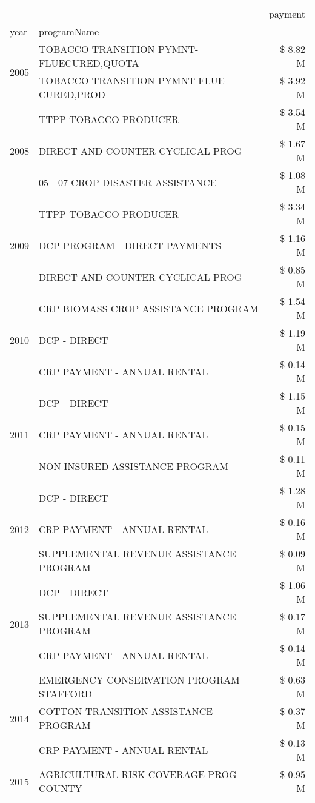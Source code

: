 \begin{tabular}{llr}
\toprule
 &  & payment \\
year & programName &  \\
\midrule
\multirow[t]{2}{*}{2005} & TOBACCO TRANSITION PYMNT-FLUECURED,QUOTA & \$ 8.82 M \\
 & TOBACCO TRANSITION PYMNT-FLUE CURED,PROD & \$ 3.92 M \\
\cline{1-3}
\multirow[t]{3}{*}{2008} & TTPP TOBACCO PRODUCER & \$ 3.54 M \\
 & DIRECT AND COUNTER CYCLICAL PROG & \$ 1.67 M \\
 & 05 - 07 CROP DISASTER ASSISTANCE & \$ 1.08 M \\
\cline{1-3}
\multirow[t]{3}{*}{2009} & TTPP TOBACCO PRODUCER & \$ 3.34 M \\
 & DCP PROGRAM - DIRECT PAYMENTS & \$ 1.16 M \\
 & DIRECT AND COUNTER CYCLICAL PROG & \$ 0.85 M \\
\cline{1-3}
\multirow[t]{3}{*}{2010} & CRP BIOMASS CROP ASSISTANCE PROGRAM & \$ 1.54 M \\
 & DCP - DIRECT & \$ 1.19 M \\
 & CRP PAYMENT - ANNUAL RENTAL & \$ 0.14 M \\
\cline{1-3}
\multirow[t]{3}{*}{2011} & DCP - DIRECT & \$ 1.15 M \\
 & CRP PAYMENT - ANNUAL RENTAL & \$ 0.15 M \\
 & NON-INSURED ASSISTANCE PROGRAM & \$ 0.11 M \\
\cline{1-3}
\multirow[t]{3}{*}{2012} & DCP - DIRECT & \$ 1.28 M \\
 & CRP PAYMENT - ANNUAL RENTAL & \$ 0.16 M \\
 & SUPPLEMENTAL REVENUE ASSISTANCE PROGRAM & \$ 0.09 M \\
\cline{1-3}
\multirow[t]{3}{*}{2013} & DCP - DIRECT & \$ 1.06 M \\
 & SUPPLEMENTAL REVENUE ASSISTANCE PROGRAM & \$ 0.17 M \\
 & CRP PAYMENT - ANNUAL RENTAL & \$ 0.14 M \\
\cline{1-3}
\multirow[t]{3}{*}{2014} & EMERGENCY CONSERVATION PROGRAM STAFFORD & \$ 0.63 M \\
 & COTTON TRANSITION ASSISTANCE PROGRAM & \$ 0.37 M \\
 & CRP PAYMENT - ANNUAL RENTAL & \$ 0.13 M \\
\cline{1-3}
\multirow[t]{3}{*}{2015} & AGRICULTURAL RISK COVERAGE PROG - COUNTY & \$ 0.95 M \\

\end{tabular}
